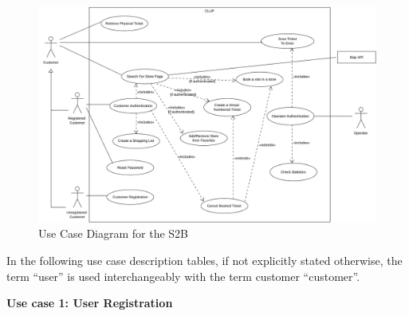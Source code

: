 \begin{figure}[H]
    \includegraphics[width=\textwidth]{Images/UML_use_case_diagram.png}
    \caption{\label{fig:Use_Case_Diag}Use Case Diagram for the S2B}
\end{figure}


\medskip
\clearpage
In the following use case description tables, if not explicitly stated otherwise, the term ``user'' is used interchangeably with the term customer ``customer''.
\medskip

\textbf{Use case 1: User Registration}
\smallskip

